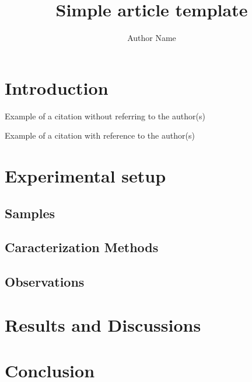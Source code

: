 \documentclass[11pt, a4paper, notitlepage]{article}
\begin{document}
	\title{Simple article template}
	
	\author{Author Name}
	
	\maketitle
	
	\begin{abstract}
		\lipsum[1]
	\end{abstract}
	
	

	\section{Introduction}%
	\lipsum[2] 
	
	Example of a citation without referring to the author(s) \citep{Author2017, Author2017-1} 
	
	Example of a citation with reference to the author(s) \citet{Author2017-2} 
	
	
	\section{Experimental setup}
	
	\subsection{Samples}
	\lipsum[3-5] 
	
	\subsection{Caracterization Methods}
	\lipsum[6-9] 
	
	
	\subsection{Observations}
	\lipsum[10-12] 
	
	\section{Results and Discussions}
	\lipsum[13-20]
	
	\section{Conclusion}
	\lipsum[21-23]

	
	
	\printbibliography[heading=bibintoc]
\end{document}
